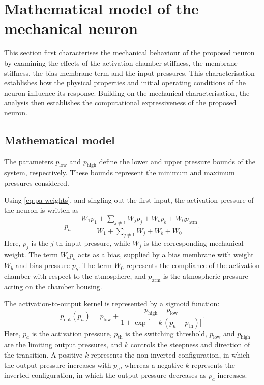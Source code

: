 \documentclass[11pt,a4paper]{article}
\numberwithin{equation}{section}
\newcommand{\pout}{p_{\mathrm{out}}}
\newcommand{\patm}{p_{\mathrm{atm}}}
\newcommand{\plow}{p_{\mathrm{low}}}
\newcommand{\phigh}{p_{\mathrm{high}}}
\newcommand{\pth}{p_{\mathrm{th}}}
\begin{document}
\section{Mathematical model of the mechanical neuron}

This section first characterises the mechanical behaviour of the proposed neuron by examining the effects of the
activation-chamber stiffness, the membrane stiffness, the bias membrane term and the input pressures. This
characterisation establishes how the physical properties and initial operating conditions of the neuron influence
its response. Building on the mechanical characterisation, the analysis then establishes the computational
expressiveness of the proposed neuron.

\subsection{Mathematical model}

The parameters $\plow$ and $\phigh$ define the lower and upper pressure bounds of the system, respectively. These
bounds represent the minimum and maximum pressures considered.

Using \cref{eq:pa-weights}, and singling out the first input, the activation pressure of the neuron is written as
\begin{equation}
  p_a = \frac{W_1 p_1 + \sum_{j\neq 1} W_j p_j + W_b p_b + W_0 \patm}{W_1 + \sum_{j\neq 1} W_j + W_b + W_0} .
  \label{eq:pa-full}
\end{equation}
Here, $p_j$ is the $j$-th input pressure, while $W_j$ is the corresponding mechanical weight. The term $W_b p_b$
acts as a bias, supplied by a bias membrane with weight $W_b$ and bias pressure $p_b$. The term $W_0$ represents the
compliance of the activation chamber with respect to the atmosphere, and $\patm$ is the atmospheric pressure acting
on the chamber housing.

The activation-to-output kernel is represented by a sigmoid function:
\begin{equation}
  \pout(p_a) = \plow + \frac{\phigh - \plow}{1 + \exp\bigl[-k\,(p_a - \pth)\bigr]} .
  \label{eq:sigmoid}
\end{equation}
Here, $p_a$ is the activation pressure, $\pth$ is the switching threshold, $\plow$ and $\phigh$ are the limiting
output pressures, and $k$ controls the steepness and direction of the transition. A positive $k$ represents the
non-inverted configuration, in which the output pressure increases with $p_a$, whereas a negative $k$ represents the
inverted configuration, in which the output pressure decreases as $p_a$ increases.
\end{document}
